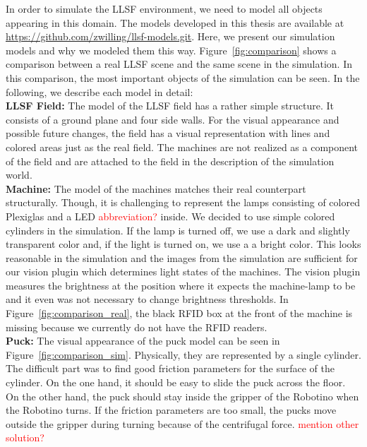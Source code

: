 In order to simulate the LLSF environment, we need to model all objects appearing in this domain. The models developed in this thesis are available at \url{https://github.com/zwilling/llsf-models.git}. Here, we present our simulation models and why we modeled them this way. Figure~\ref{fig:comparison} shows a comparison between a real LLSF scene and the same scene in the simulation. In this comparison, the most important objects of the simulation can be seen. In the following, we describe each model in detail:\\
\textbf{LLSF Field:} The model of the LLSF field has a rather simple structure. It consists of a ground plane and four side walls. For the visual appearance and possible future changes, the field has a visual representation with lines and colored areas just as the real field. The machines are not realized as a component of the field and are attached to the field in the description of the simulation world.\\
\textbf{Machine:} The model of the machines matches their real counterpart structurally. Though, it is challenging to represent the lamps consisting of colored Plexiglas and a LED \textcolor{red}{abbreviation?} inside. We decided to use simple colored cylinders in the simulation. If the lamp is turned off, we use a dark and slightly transparent color and, if the light is turned on, we use a a bright color. This looks reasonable in the simulation and the images from the simulation are sufficient for our vision plugin which determines light states of the machines. The vision plugin measures the brightness at the position where it expects the machine-lamp to be and it even was not necessary to change brightness thresholds. In Figure~\ref{fig:comparison_real}, the black RFID box at the front of the machine is missing because we currently do not have the RFID readers.\\
\textbf{Puck:} The visual appearance of the puck model can be seen in Figure~\ref{fig:comparison_sim}. Physically, they are represented by a single cylinder. The difficult part was to find good friction parameters for the surface of the cylinder. On the one hand, it should be easy to slide the puck across the floor. On the other hand, the puck should stay inside the gripper of the Robotino when the Robotino turns. If the friction parameters are too small, the pucks move outside the gripper during turning because of the centrifugal force. \textcolor{red}{mention other solution?}\\
